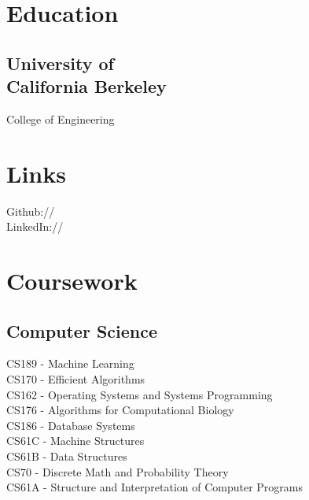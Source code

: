 \documentclass[]{format}
\begin{document}
%
%



%
%

\begin{minipage}[t]{0.33\textwidth} 


\section{Education} 
\subsection[University of California Berkeley]{\texorpdfstring{University of \\ California Berkeley}{University of California Berkeley}}
College of Engineering \\
\sectionsep


\section{Links} 
Github:// \href{https://github.com/SirjanK}{} \\
LinkedIn://  \href{https://www.linkedin.com/in/sirjankafle}{} \\
\sectionsep


\section{Coursework}
\subsection{Computer Science}
CS189 - Machine Learning \\
CS170 - Efficient Algorithms \\
CS162 - Operating Systems and Systems Programming \\
CS176 - Algorithms for Computational Biology \\
CS186 - Database Systems \\
CS61C - Machine Structures \\
CS61B - Data Structures \\
CS70 - Discrete Math and Probability Theory \\
CS61A - Structure and Interpretation of Computer Programs
\sectionsep


\end{minipage}
\end{document}
